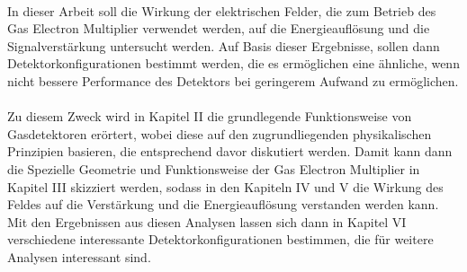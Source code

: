 \\
In dieser Arbeit soll die Wirkung der elektrischen Felder, die zum Betrieb des Gas Electron Multiplier verwendet werden, auf die Energieauflösung und die Signalverstärkung untersucht werden. Auf Basis dieser Ergebnisse, sollen dann Detektorkonfigurationen bestimmt werden, die es ermöglichen eine ähnliche, wenn nicht bessere Performance des Detektors bei geringerem Aufwand zu ermöglichen.\\
\\
Zu diesem Zweck wird in Kapitel II die grundlegende Funktionsweise von Gasdetektoren erörtert, wobei diese auf den zugrundliegenden physikalischen Prinzipien basieren, die entsprechend davor diskutiert werden. Damit kann dann die Spezielle Geometrie und Funktionsweise der Gas Electron Multiplier in Kapitel III skizziert werden, sodass in den Kapiteln IV und V die Wirkung des Feldes auf die Verstärkung und die Energieauflösung verstanden werden kann. Mit den Ergebnissen aus diesen Analysen lassen sich dann in Kapitel VI verschiedene interessante Detektorkonfigurationen bestimmen, die für weitere Analysen interessant sind. 
